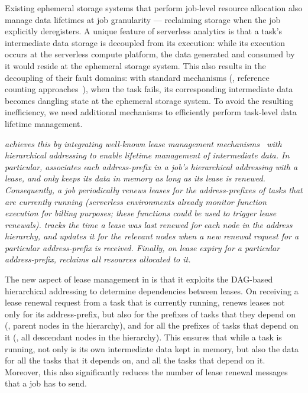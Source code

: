 Existing ephemeral storage systems that perform job-level resource allocation also manage data lifetimes at job granularity --- reclaiming storage when the job explicitly deregisters. A unique feature of serverless analytics is that a task's intermediate data storage is decoupled from its execution: while its execution occurs at the serverless compute platform, the data generated and consumed by it would reside at the ephemeral storage system. This also results in the decoupling of their fault domains: with standard mechanisms (\eg, reference counting approaches~\cite{refcount1, refcount2, refcount3}), when the task fails, its corresponding intermediate data becomes dangling state at the ephemeral storage system. To avoid the resulting inefficiency, we need additional mechanisms to efficiently perform task-level data lifetime management.

\sl achieves this by integrating well-known lease management mechanisms~\cite{gray1989leases, chubby, dhcplease} with hierarchical addressing to enable lifetime management of intermediate data. In particular, \jiffy associates each address-prefix in a job's hierarchical addressing with a lease, and only keeps its data in memory as long as its lease is renewed. Consequently, a job periodically renews leases for the address-prefixes of tasks that are currently running (serverless environments already monitor function execution for billing purposes; these functions could be used to trigger lease renewals). \jiffy tracks the time a lease was last renewed for each node in the address hierarchy, and updates it for the relevant nodes when a new renewal request for a particular address-prefix is received. Finally, on lease expiry for a particular address-prefix, \jiffy reclaims all resources allocated to it.

The new aspect of lease management in \jiffy is that it exploits the DAG-based hierarchical addressing to determine dependencies between leases. On receiving a lease renewal request from a task that is currently running, \jiffy renews leases not only for its address-prefix, but also for the prefixes of tasks that they depend on (\ie, parent nodes in the hierarchy), and for all the prefixes of tasks that depend on it (\ie, all descendant nodes in the hierarchy). This ensures that while a task is running, not only is its own intermediate data kept in memory, but also the data for all the tasks that it depends on, and all the tasks that depend on it. Moreover, this also significantly reduces the number of lease renewal messages that a job has to send. 


